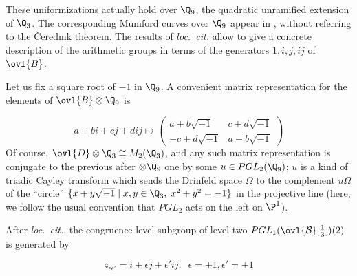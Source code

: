 \begin{para}\label{para::6.3.2} These uniformizations actually hold over
 $\Q_9$, the quadratic unramified extension of $\Q_3$. The corresponding
 Mumford curves over $\Q_9$ appear in \cite[IX]{sgamc}, without 
 referring to the \v{C}erednik theorem. The results of {\it loc.~cit.}
 allow to give a concrete description of the 
 arithmetic groups in terms of the generators $1,i,j,ij$ of $\ovl{B}$. 

 Let us fix a square root of $-1$ in $\Q_9$. A convenient matrix
 representation %
 for the elements of $\ovl{B}\otimes\Q_9$ is 

\begin{equation*}
a+bi+cj+dij \mapsto
 \begin{pmatrix}
  a+b\sqrt{-1} & c+d\sqrt{-1}
  \\-c+d\sqrt{-1} & a-b\sqrt{-1}  
 \end{pmatrix}
\end{equation*}  
 \noindent Of course, $\ovl{D}\otimes\Q_3\cong M_2(\Q_3)$, and any such
 matrix representation is conjugate to the previous after
 $\otimes\Q_9$ one by some $u\in PGL_2(\Q_9)$; $u$ is a kind of triadic
 Cayley transform which sends the Drinfeld space 
 $\Omega$ to the complement $u\Omega$ of the ``circle''
 $\{x+y\sqrt{-1}\mid x,y\in \Q_3, \;x^2+y^2=-1\}$ in the projective line  
 (here, we follow the usual convention that $PGL_2$ acts on the left on
 $\P^1$).
 
 After {\it loc.~cit.}, the congruence level subgroup of level two
 $PGL_1(\ovl{\mathcal{B}}[\frac{1}{3}])(2)$ is generated by 

 \begin{equation*}
  z_{\epsilon\epsilon'}=i+\epsilon j +\epsilon' ij,\;\;\epsilon=\pm 1,
   \epsilon' =\pm 1
 \end{equation*}


\end{para}
